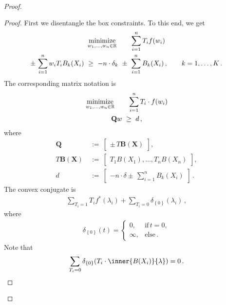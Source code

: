 \begin{proof}
\begin{lemma}
  \end{lemma}
  \begin{proof}
    First we disentangle the box constraints.
    To this end, we get
    \begin{gather*}
    \underset{w_1, \ldots, w_n \in \R}{\mathrm{minimize}}
    \qquad
    \sum_{i = 1}^{n} T_i f(w_i)
    \\
      \pm\,\sum_{i = 1}^{n} w_i T_i B_k(X_i)
      \ 
      \ge
      \ 
      -n\cdot\delta_k
      \ 
      \pm 
      \ 
      \sum_{i = 1}^{n} B_k(X_i)
      \,,
      \qquad
      k=1,\ldots,K
      \,.
    \end{gather*}
    The corresponding matrix notation is
 \begin{gather*}
    \underset{w_1, \ldots, w_n \in \R}{\mathrm{minimize}}
    \qquad
    \sum_{i = 1}^{n} T_i \cdot f(w_i)
    \\
    \mathbf{Q}w 
    \ 
    \ge
    \ 
    d
    \,,
\end{gather*}
where
\begin{align*}
    \mathbf{Q}
    &
    \ 
    :=
    \ 
    \begin{bmatrix}
      \pm\,T\mathbf{B}(\mathbf{X})
    \end{bmatrix}
    ,
    \\
    T\mathbf{B}(\mathbf{X})
    &
    \ 
    :=
    \ 
    \begin{bmatrix}
      T_1B(X_1), \ldots, T_nB(X_n)
    \end{bmatrix}
    ,
    \\
    d
    &
    \ 
    :=
    \ 
    \begin{bmatrix}
      -n\cdot\delta 
      \pm\,
      \sum_{i = 1}^{n} B_k(X_i)
    \end{bmatrix}
    \,.
  \end{align*}
The convex conjugate is
\begin{gather*}
  \sum_{T_i=1} T_i f^*(\lambda_i)
  +
  \sum_{T_i=0} 
  \delta_{\left\{ 0 \right\}}(\lambda_i)
  \,,
\end{gather*}
where
\begin{gather*}
  \delta_{\left\{ 0 \right\}}
  (t)
  =
  \begin{cases}
    0,& \text{if}\, t=0,\\
    \infty,& \text{else}\,.
  \end{cases}
\end{gather*}
Note that
\begin{gather*}
  \sum_{T_i=0} 
  \delta_{\left\{ 0 \right\}}
  (
  T_i \cdot \inner{B(X_i)}{\lambda}
  )
  =
  0
  \,.
\end{gather*}


\end{proof}
\end{proof}
